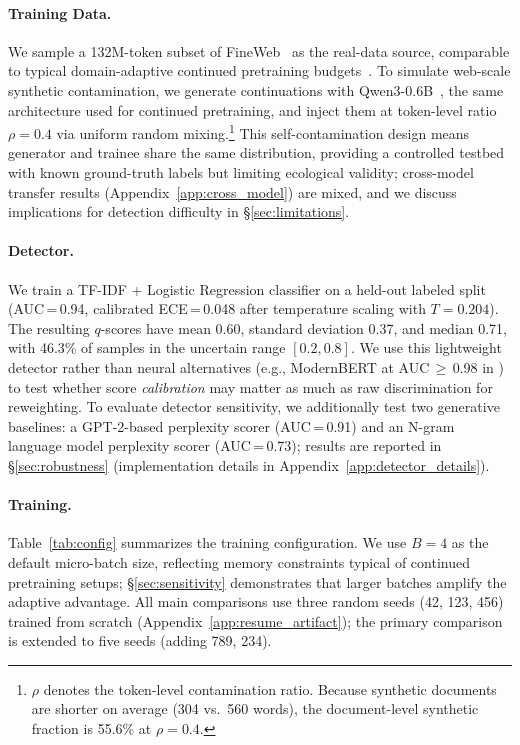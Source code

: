 \paragraph{Training Data.}
We sample a 132M-token subset of FineWeb~\citep{penedo2024fineweb} as the real-data source, comparable to typical domain-adaptive continued pretraining budgets~\citep{gururangan2020dont}.
To simulate web-scale synthetic contamination, we generate continuations with Qwen3-0.6B~\citep{yang2025qwen3}, the same architecture used for continued pretraining, and inject them at token-level ratio $\rho = 0.4$ via uniform random mixing.\footnote{$\rho$ denotes the token-level contamination ratio. Because synthetic documents are shorter on average (304 vs.\ 560 words), the document-level synthetic fraction is 55.6\% at $\rho{=}0.4$.}
This self-contamination design means generator and trainee share the same distribution, providing a controlled testbed with known ground-truth labels but limiting ecological validity; cross-model transfer results (Appendix~\ref{app:cross_model}) are mixed, and we discuss implications for detection difficulty in \S\ref{sec:limitations}.

\paragraph{Detector.}
We train a TF-IDF + Logistic Regression classifier on a held-out labeled split (AUC\,=\,0.94, calibrated ECE\,=\,0.048 after temperature scaling with $T{=}0.204$).
The resulting $q$-scores have mean 0.60, standard deviation 0.37, and median 0.71, with 46.3\% of samples in the uncertain range $[0.2, 0.8]$.
We use this lightweight detector rather than neural alternatives (e.g., ModernBERT at AUC\,${\geq}$\,0.98 in \citealt{drayson2025detection}) to test whether score \emph{calibration} may matter as much as raw discrimination for reweighting.
To evaluate detector sensitivity, we additionally test two generative baselines: a GPT-2-based perplexity scorer (AUC\,=\,0.91) and an N-gram language model perplexity scorer (AUC\,=\,0.73); results are reported in \S\ref{sec:robustness} (implementation details in Appendix~\ref{app:detector_details}).

\paragraph{Training.}
Table~\ref{tab:config} summarizes the training configuration.
We use $B{=}4$ as the default micro-batch size, reflecting memory constraints typical of continued pretraining setups; \S\ref{sec:sensitivity} demonstrates that larger batches amplify the adaptive advantage.
All main comparisons use three random seeds (42, 123, 456) trained from scratch (Appendix~\ref{app:resume_artifact}); the primary comparison is extended to five seeds (adding 789, 234).

